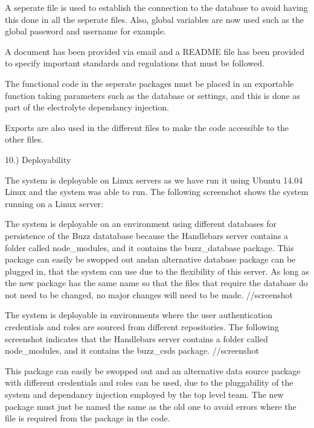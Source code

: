 \documentclass[hidelinks, 12pt, oneside]{article}
\begin{document}
A seperate file is used to establish the connection to the database to avoid having this done in all the seperate files. Also, global variables are now used such as the global password and username for example. 

A document has been provided via email and a README file has been provided to specify important standards and regulations that must be followed.

The functional code in the seperate packages must be placed in an exportable function taking parameters such as the database or settings, and this is done as part of the electrolyte dependancy injection. 

Exports are also used in the different files to make the code accessible to the other files.

10.) Deployability

The system is deployable on Linux servers as we have run it using Ubuntu 14.04 Linux and the system was able to run. The following screenshot shows the system running on a Linux server:

The system is deployable on an environment using different databases for persistence of the Buzz datatabase because the Handlebars server contains a folder called node_modules, and it contains the buzz_database package. This package can easily be swopped out andan alternative database package can be plugged in, that the system can use due to the flexibility of this server. As long as the new package has the same name so that the files that require the database do not need to be changed, no major changes will need to be made.  
//screenshot

The system is deployable in environments where the user authentication credentials and roles are sourced from different repositories. The following screenshot indicates that the Handlebars server contains a folder called node_modules, and it contains the buzz_csds package. 
//screenshot

This package can easily be swopped out and an alternative data source package with different credentials and roles can be used, due to the pluggability of the system and dependancy injection employed by the top level team. The new package must just be named the same as the old one to avoid errors where the file is required from the package in the code. 
\end{document}
